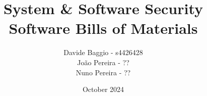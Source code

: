 \documentclass[12pt]{article}
\title{\textbf{System \& Software Security \\ Software Bills of Materials}}
\author{Davide Baggio - s4426428 \\ João Pereira - ?? \\ Nuno Pereira - ??}
\date{October 2024}
\begin{document}
\begin{titlepage}
    \maketitle
    \thispagestyle{empty}

    \vfill

    \tableofcontents

    \vfill

    
\end{titlepage}








\newpage
\printbibliography
\end{document}

